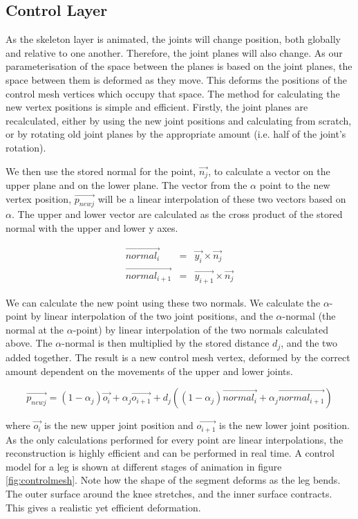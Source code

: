 \documentclass[10pt,oneside,fleqn,a4paper]{book}
\begin{document}
\subsection{\label{sec:chaincontrolanim}Control Layer}
As the skeleton layer is animated, the joints will change position, both globally and relative to one another. Therefore, the joint planes will also change. As our parameterisation of the space between the planes is based on the joint planes, the space between them is deformed as they move. This deforms the positions of the control mesh vertices which occupy that space. The method for calculating the new vertex positions is simple and efficient. Firstly, the joint planes are recalculated, either by using the new joint positions and calculating from scratch, or by rotating old joint planes by the appropriate amount (i.e. half of the joint's rotation).

We then use the stored normal for the point, $\vec{n_j}$, to calculate a vector on the upper plane and on the lower plane. The vector from the $\alpha$ point to the new vertex position, $\vec{p_{newj}}$ will be a linear interpolation of these two vectors based on $\alpha$. The upper and lower vector are calculated as the cross product of the stored normal with the upper and lower y axes.

\begin{eqnarray} \label{eqn:normals}
\vec{normal_i} & = & \vec{y_i} \times \vec{n_j} \nonumber \\ 
\vec{normal_{i+1}} & = & \vec{y_{i+1}} \times \vec{n_j} \nonumber
\end{eqnarray}

We can calculate the new point using these two normals. We calculate the $\alpha$-point by linear interpolation of the two joint positions, and the $\alpha$-normal (the normal at the $\alpha$-point) by linear interpolation of the two normals calculated above. The $\alpha$-normal is then multiplied by the stored distance $d_j$, and the two added together. The result is a new control mesh vertex, deformed by the correct amount dependent on the movements of the upper and lower joints.

\begin{equation} \label{eqn:rebuild}
\vec{p_{newj}}  = (1-\alpha_j)\vec{o_i} + \alpha_j\vec{o_{i+1}} + d_j((1-\alpha_j)\vec{normal_i} + \alpha_j\vec{normal_{i+1}})
\end{equation}

where $\vec{o_i}$ is the new upper joint position and $\vec{o_{i+1}}$ is the new lower joint position. As the only calculations performed for every point are linear interpolations, the reconstruction is highly efficient and can be performed in real time. A control model for a leg is shown at different stages of animation in figure \ref{fig:controlmesh}. Note how the shape of the segment deforms as the leg bends. The outer surface around the knee stretches, and the inner surface contracts. This gives a realistic yet efficient deformation. 
\end{document}
